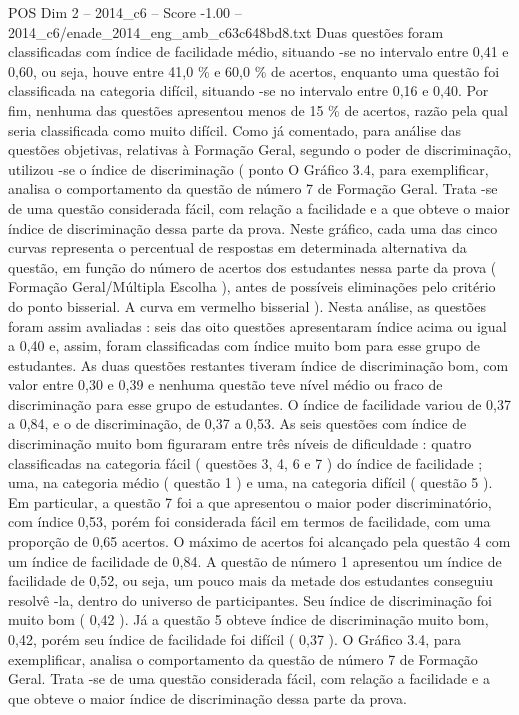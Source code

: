 \begin{textsample}{POS Dim 2 – 2014\_c6 – Score -1.00 – 2014\_c6/enade\_2014\_eng\_amb\_c63c648bd8.txt}
Duas questões foram classificadas com índice de facilidade médio, situando -se no intervalo entre 0,41 e 0,60, ou seja, houve entre 41,0 \% e 60,0 \% de acertos, enquanto uma questão foi classificada na categoria difícil, situando -se no intervalo entre 0,16 e 0,40.
Por fim, nenhuma das questões apresentou menos de 15 \% de acertos, razão pela qual seria classificada como muito difícil.
Como já comentado, para análise das questões objetivas, relativas à Formação Geral, segundo o poder de discriminação, utilizou -se o índice de discriminação ( ponto O Gráfico 3.4, para exemplificar, analisa o comportamento da questão de número 7 de Formação Geral.
Trata -se de uma questão considerada fácil, com relação a facilidade e a que obteve o maior índice de discriminação dessa parte da prova.
Neste gráfico, cada uma das cinco curvas representa o percentual de respostas em determinada alternativa da questão, em função do número de acertos dos estudantes nessa parte da prova ( Formação Geral/Múltipla Escolha ), antes de possíveis eliminações pelo critério do ponto bisserial.
A curva em vermelho bisserial ).
Nesta análise, as questões foram assim avaliadas : seis das oito questões apresentaram índice acima ou igual a 0,40 e, assim, foram classificadas com índice muito bom para esse grupo de estudantes.
As duas questões restantes tiveram índice de discriminação bom, com valor entre 0,30 e 0,39 e nenhuma questão teve nível médio ou fraco de discriminação para esse grupo de estudantes.
O índice de facilidade variou de 0,37 a 0,84, e o de discriminação, de 0,37 a 0,53.
As seis questões com índice de discriminação muito bom figuraram entre três níveis de dificuldade : quatro classificadas na categoria fácil ( questões 3, 4, 6 e 7 ) do índice de facilidade ; uma, na categoria médio ( questão 1 ) e uma, na categoria difícil ( questão 5 ).
Em particular, a questão 7 foi a que apresentou o maior poder discriminatório, com índice 0,53, porém foi considerada fácil em termos de facilidade, com uma proporção de 0,65 acertos.
O máximo de acertos foi alcançado pela questão 4 com um índice de facilidade de 0,84.
A questão de número 1 apresentou um índice de facilidade de 0,52, ou seja, um pouco mais da metade dos estudantes conseguiu resolvê -la, dentro do universo de participantes.
Seu índice de discriminação foi muito bom ( 0,42 ).
Já a questão 5 obteve índice de discriminação muito bom, 0,42, porém seu índice de facilidade foi difícil ( 0,37 ).
O Gráfico 3.4, para exemplificar, analisa o comportamento da questão de número 7 de Formação Geral.
Trata -se de uma questão considerada fácil, com relação a facilidade e a que obteve o maior índice de discriminação dessa parte da prova.

\end{textsample}

